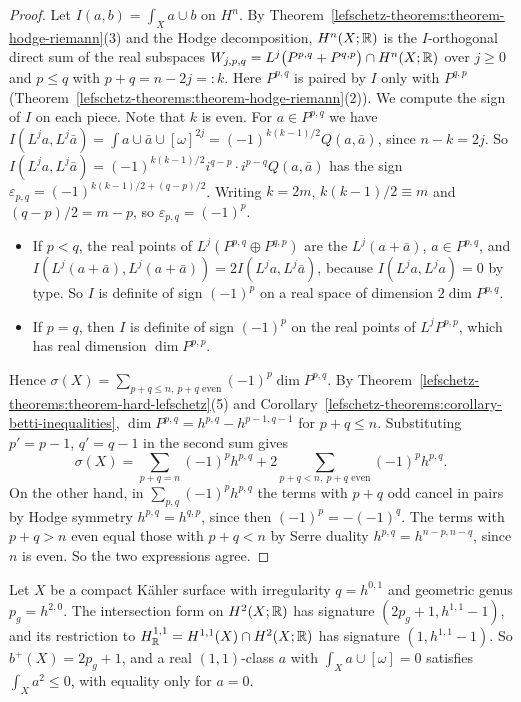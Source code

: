 \begin{proof}
Let $I(a, b) = \int_Xa \cup b$ on $H^n$. By Theorem~\ref{lefschetz-theorems:theorem-hodge-riemann}(3) and the Hodge decomposition, $H^n(X; \mathbb{R})$
is the $I$-orthogonal direct sum of the real subspaces $W_{j,p,q} = L^j\big(P^{p,q} + P^{q,p}\big) \cap H^n(X; \mathbb{R})$ over $j \geq 0$ and
$p \leq q$ with $p + q = n - 2j =: k$. Here $P^{p,q}$ is paired by $I$ only with $P^{q,p}$ (Theorem~\ref{lefschetz-theorems:theorem-hodge-riemann}(2)).
We compute the sign of $I$ on each piece. Note that $k$ is even. For $a \in P^{p,q}$ we have
$I(L^ja, L^j\bar a) = \int a \cup \bar a \cup [\omega]^{2j} = (-1)^{k(k-1)/2}Q(a, \bar a)$, since $n - k = 2j$. So
$I(L^ja, L^j\bar a) = (-1)^{k(k-1)/2}i^{q-p}\cdot i^{p-q}Q(a, \bar a)$ has the sign $\varepsilon_{p,q} = (-1)^{k(k-1)/2 + (q-p)/2}$. Writing $k = 2m$,
$k(k-1)/2 \equiv m$ and $(q - p)/2 = m - p$, so $\varepsilon_{p,q} = (-1)^p$.
\begin{itemize}
\item If $p < q$, the real points of $L^j(P^{p,q} \oplus P^{q,p})$ are the $L^j(a + \bar a)$, $a \in P^{p,q}$, and
$I(L^j(a + \bar a), L^j(a + \bar a)) = 2I(L^ja, L^j\bar a)$, because $I(L^ja, L^ja) = 0$ by type. So $I$ is definite of sign $(-1)^p$ on a
real space of dimension $2\dim P^{p,q}$.
\item If $p = q$, then $I$ is definite of sign $(-1)^p$ on the real points of $L^jP^{p,p}$, which has real dimension $\dim P^{p,p}$.
\end{itemize}
Hence $\sigma(X) = \sum_{p+q \leq n,\ p+q \text{ even}}(-1)^p\dim P^{p,q}$. By
Theorem~\ref{lefschetz-theorems:theorem-hard-lefschetz}(5) and Corollary~\ref{lefschetz-theorems:corollary-betti-inequalities},
$\dim P^{p,q} = h^{p,q} - h^{p-1,q-1}$ for $p + q \leq n$. Substituting $p' = p - 1$, $q' = q - 1$ in the second sum gives
\[
\sigma(X) = \sum_{p+q = n}(-1)^ph^{p,q} + 2\sum_{p+q < n,\ p+q \text{ even}}(-1)^ph^{p,q} .
\]
On the other hand, in $\sum_{p,q}(-1)^ph^{p,q}$ the terms with $p + q$ odd cancel in pairs by Hodge symmetry $h^{p,q} = h^{q,p}$, since then
$(-1)^p = -(-1)^q$. The terms with $p + q > n$ even equal those with $p + q < n$ by Serre duality $h^{p,q} = h^{n-p,n-q}$, since $n$ is
even. So the two expressions agree.
\end{proof}

\begin{corollary}\label{lefschetz-theorems:corollary-surfaces}
Let $X$ be a compact K\"ahler surface with irregularity $q = h^{0,1}$ and geometric genus $p_g = h^{2,0}$. The intersection form on
$H^2(X; \mathbb{R})$ has signature $(2p_g + 1, h^{1,1} - 1)$, and its restriction to $H^{1,1}_{\mathbb{R}} = H^{1,1}(X) \cap H^2(X; \mathbb{R})$ has signature
$(1, h^{1,1} - 1)$. So $b^+(X) = 2p_g + 1$, and a real $(1,1)$-class $a$ with $\int_Xa \cup [\omega] = 0$ satisfies $\int_Xa^2 \leq 0$, with
equality only for $a = 0$.
\end{corollary}

